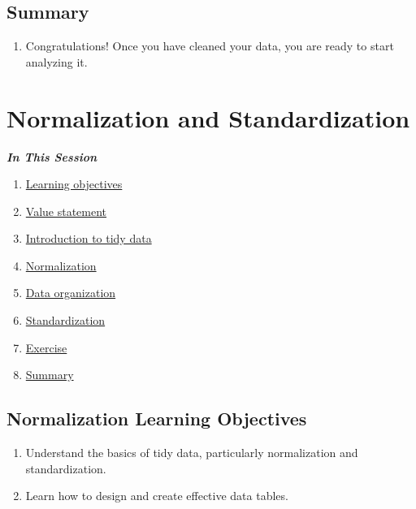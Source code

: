 \documentclass[
]{book}
\providecommand{\tightlist}{%
  \setlength{\itemsep}{0pt}\setlength{\parskip}{0pt}}
\begin{document}
\hypertarget{summary-1}{%
\subsection{Summary}\label{summary-1}}

\begin{enumerate}
\def\labelenumi{\arabic{enumi}.}
\tightlist
\item
  Congratulations! Once you have cleaned your data, you are ready to start analyzing it.
\end{enumerate}

\hypertarget{normalization-and-standardization}{%
\section{Normalization and Standardization}\label{normalization-and-standardization}}

\textbf{\emph{In This Session}}

\begin{enumerate}
\def\labelenumi{\arabic{enumi}.}
\tightlist
\item
  \protect\hyperlink{normalization-learning-objectives}{Learning objectives}
\item
  \protect\hyperlink{value-statement}{Value statement}
\item
  \protect\hyperlink{introduction-to-tidy-data}{Introduction to tidy data}
\item
  \protect\hyperlink{normalization}{Normalization}
\item
  \protect\hyperlink{data-organization}{Data organization}
\item
  \protect\hyperlink{standardization}{Standardization}
\item
  \protect\hyperlink{exercise}{Exercise}
\item
  \protect\hyperlink{normalization-and-standardization-summary}{Summary}
\end{enumerate}

\hypertarget{normalization-learning-objectives}{%
\subsection{Normalization Learning Objectives}\label{normalization-learning-objectives}}

\begin{enumerate}
\def\labelenumi{\arabic{enumi}.}
\item
  Understand the basics of tidy data, particularly normalization and standardization.
\item
  Learn how to design and create effective data tables.
\end{enumerate}
\end{document}
